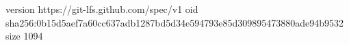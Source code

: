 version https://git-lfs.github.com/spec/v1
oid sha256:0b15d5aef7a60cc637adb1287bd5d34e594793e85d309895473880ade94b9532
size 1094
